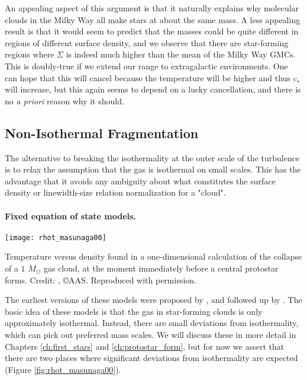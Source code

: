 An appealing aspect of this argument is that it naturally explains why molecular clouds in the Milky Way all make stars at about the same mass. A less appealing result is that it would seem to predict that the masses could be quite different in regions of different surface density, and we observe that there are star-forming regions where $\Sigma$ is indeed much higher than the mean of the Milky Way GMCs. This is doubly-true if we extend our range to extragalactic environments. One can hope that this will cancel because the temperature will be higher and thus $c_s$ will increase, but this again seems to depend on a lucky cancellation, and there is no \textit{a priori} reason why it should.

\subsection{Non-Isothermal Fragmentation}

The alternative to breaking the isothermality at the outer scale of the turbulence is to relax the assumption that the gas is isothermal on small scales. This has the advantage that it avoids any ambiguity about what constitutes the surface density or linewidth-size relation normalization for a "cloud".

\paragraph{Fixed equation of state models.}

\begin{marginfigure}
\texttt{[image: rhot\_masunaga00]}
\caption[Temperature versus density in a collapsing core]{
\label{fig:rhot_masunaga00}
Temperature versus density found in a one-dimensional calculation of the collapse of a $1$ $M_\odot$ gas cloud, at the moment immediately before a central protostar forms. Credit: \citet{masunaga00a}, \copyright AAS. Reproduced with permission.
}
\end{marginfigure}
The earliest versions of these models were proposed by \citet{larson05a}, and followed up by \citet{jappsen05a}. The basic idea of these models is that the gas in star-forming clouds is only approximately isothermal. Instead, there are small deviations from isothermality, which can pick out preferred mass scales. We will discuss these in more detail in Chapters \ref{ch:first_stars} and \ref{ch:protostar_form}, but for now we assert that there are two places where significant deviations from isothermality are expected (Figure \ref{fig:rhot_masunaga00}).

